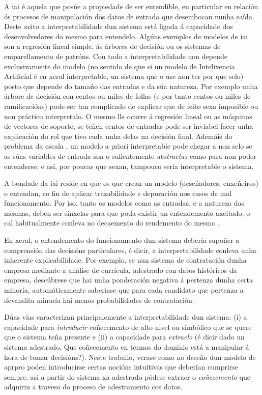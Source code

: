 A \acrfull{iai} é aquela que posúe a propiedade de ser entendible, en particular en relación ós procesos de manipulación dos datos de entrada que desembocan nunha saída. Deste xeito a \gls{interpretabilidade} dun sistema está ligada á capacidade dos desenvolvedores do mesmo para entendelo. Algúns exemplos de modelos de \acrshort{iai} son a regresión lineal simple, ás árbores de decisión ou os sistemas de emparellamento de patróns. Con todo a \gls{interpretabilidade} non depende exclusivamente do modelo (no sentido de que si un modelo de Intelixencia Artificial é en xeral interpretable, un sistema que o use non ter por que selo) posto que depende do tamaño das entradas e da súa natureza. Por exemplo unha árbore de decisión con centos ou miles de follas (e por tanto centos ou miles de ramificacións) pode ser tan complicado de explicar que de feito sexa imposible ou non práctico interpretalo. O mesmo lle ocurre á regresión lineal ou as máquinas de vectores de soporte, se teñen centos de entradas  pode ser inviabel facer unha explicación do rol que tivo cada unha delas na decisión final. Ademáis do problema da escala , un modelo a priori interpretable pode chegar a non selo se as súas variables de entrada son o sufientemente \emph{abstractas} como para non poder entenderse; e así, por poucas que sexan, tampouco sería interpretable o sistema.

A bondade da \acrshort{iai} reside en que os que crean un modelo (deseñadores, enxeñeiros) o entendan, co fin de aplicar trazabilidade e depuración nos casos de mal funcionamento. Por iso, tanto os modelos como as entradas, e a natureza das mesmas, deben ser sinxelas para que poda existir un entendemento axeitado, o cal habitualmente conleva no decaemento do rendemento do mesmo \cite{dualityXAI}.

En xeral, o entendemento do funcionamento dun sistema debería supoñer a comprensión das decisións particulares, é dicir, a \gls{interpretabilidade} conleva unha inherente \gls{explicabilidade}. Por exemplo, se nun sistema de contratación dunha empresa mediante a análise de currícula, adestrado con datos históricos da empresa, descúbrese que hai unha ponderación negativa á pertenza dunha certa minoría, automáticamente saberíase que para cada candidato que pertenza a devandita minoría hai menos probabilidades de contratación.

Dúas vías caracterizan principalemente a \gls{interpretabilidade} dun sistema: (i) a capacidade para \emph{introducir} coñecemento de alto nivel ou simbólico que se quere que o sistema teña presente e (ii) a capacidade para \emph{extraelo} (é dicir dado un sistema adestrado, Que coñecemento en termos do dominio está a manipular á hora de tomar decisións?). Neste traballo, verase como no deseño dun modelo de \acrshort{aprpro} poden introducirse certas nocións intuitivas que deberían cumprirse sempre, así a partir do sistema xa adestrado pódese extraer o \emph{coñecemento} que adquiriu a traveso do proceso de adestramento cos datos.


